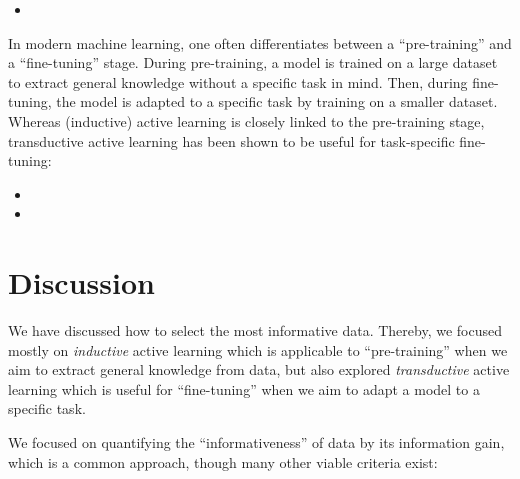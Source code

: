 \begin{oreadings}
  \begin{itemize}
    \item {}
  \end{itemize}
  In modern machine learning, one often differentiates between a ``pre-training'' and a ``fine-tuning'' stage.
  During pre-training, a model is trained on a large dataset to extract general knowledge without a specific task in mind.
  Then, during fine-tuning, the model is adapted to a specific task by training on a smaller dataset.
  Whereas (inductive) active learning is closely linked to the pre-training stage, transductive active learning has been shown to be useful for task-specific fine-tuning:
  \begin{itemize}
    \item {}
    \item {}
  \end{itemize}
\end{oreadings}




















\section*{Discussion}

We have discussed how to select the most informative data.
Thereby, we focused mostly on \emph{inductive} active learning which is applicable to ``pre-training'' when we aim to extract general knowledge from data, but also explored \emph{transductive} active learning which is useful for ``fine-tuning'' when we aim to adapt a model to a specific task.

We focused on quantifying the ``informativeness'' of data by its information gain, which is a common approach, though many other viable criteria exist:

